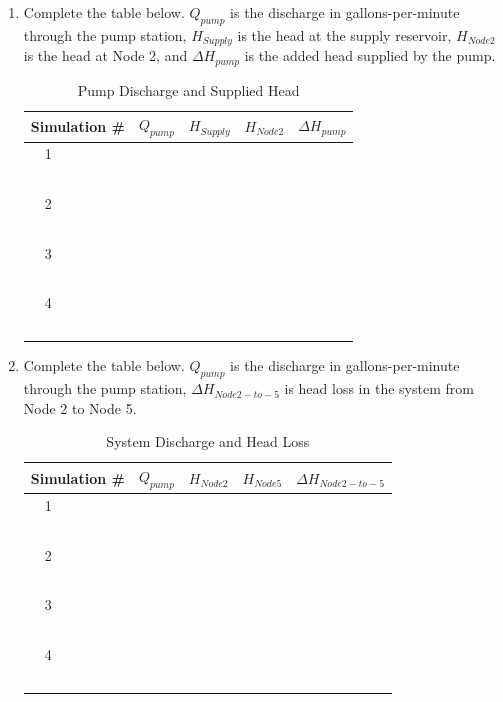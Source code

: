 \documentclass[11pt]{article}
\begin{document}
\begin{enumerate}
\begin{enumerate}
\item Complete the table below.  $Q_{pump}$ is the discharge in gallons-per-minute through the pump station, $H_{Supply}$ is the head at the supply reservoir,  $H_{Node2}$ is the head at Node 2, and $\Delta H_{pump}$ is the added head supplied by the pump.
\begin{table}[htbp]
   \centering
      \caption{Pump Discharge and Supplied Head}
   \begin{tabular}{p{1in} p{1in} p{1in} p{1in} p{1in} } %
Simulation \# & $Q_{pump}$ & $H_{Supply}$ & $H_{Node2}$ & $\Delta H_{pump}$ \\
\hline
\hline
~~1 & ~ &~ & ~ & ~ \\
~ & ~ &~ & ~ & ~ \\
\hline
~~2 & ~ &~ & ~ & ~ \\
~ & ~ &~ & ~ & ~ \\
\hline
~~3 & ~ &~ & ~ & ~\\
~ & ~ &~ & ~ & ~ \\
\hline
~~4 & ~ &~ & ~ & ~ \\
~ & ~ &~ & ~ & ~ \\
\hline
   \end{tabular}
   \label{tab:pump-curve}
\end{table}
\clearpage
\item Complete the table below.  $Q_{pump}$ is the discharge in gallons-per-minute through the pump station, $\Delta H_{Node 2 -to- 5}$ is head loss in the system from Node 2 to Node 5.
\begin{table}[htbp]
   \centering
      \caption{System Discharge and Head Loss}
   \begin{tabular}{p{1in} p{1in} p{1in} p{1in} p{1in} } %
Simulation \# & $Q_{pump}$ & $H_{Node2}$ & $H_{Node5}$ & $\Delta H_{Node 2 -to- 5}$ \\
\hline
\hline
~~1 & ~ &~ & ~ & ~ \\
~ & ~ &~ & ~ & ~ \\
\hline
~~2 & ~ &~ & ~ & ~ \\
~ & ~ &~ & ~ & ~ \\
\hline
~~3 & ~ &~ & ~ & ~\\
~ & ~ &~ & ~ & ~ \\
\hline
~~4 & ~ &~ & ~ & ~ \\
~ & ~ &~ & ~ & ~ \\
\hline
   \end{tabular}
   \label{tab:system-curve}
\end{table}




\end{enumerate}
\end{enumerate}
\end{document}
